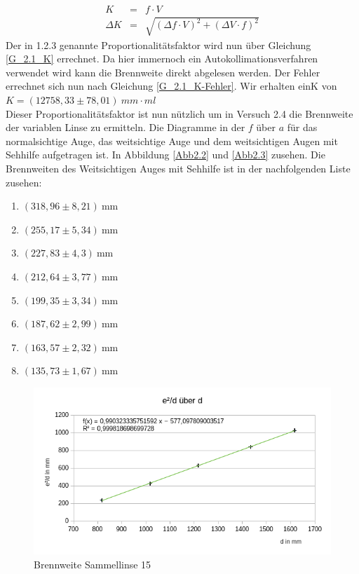 \documentclass[a4paper, 12pt]{article}
\begin{document}
	\begin{eqnarray}
		K&=&f\cdot V\label{G_2.1_K}\\
		\Delta K&=&\sqrt{(\Delta f\cdot V)^2+(\Delta V\cdot f)^2}\label{G_2.1_K-Fehler}
	\end{eqnarray}
Der in 1.2.3 genannte Proportionalitätsfaktor wird nun über Gleichung \ref{G_2.1_K} errechnet. Da hier immernoch ein Autokollimationsverfahren verwendet wird kann die Brennweite direkt abgelesen werden. Der Fehler errechnet sich nun nach Gleichung \ref{G_2.1_K-Fehler}. Wir erhalten ein$ $K von $K=(12758,33\pm 78,01)\ mm\cdot ml$ \\ Dieser Proportionalitätsfaktor ist nun nützlich um in Versuch 2.4 die Brennweite der variablen Linse zu ermitteln. Die Diagramme in der $f$ über $a$ für das normalsichtige Auge, das weitsichtige Auge und dem weitsichtigen Augen mit Sehhilfe aufgetragen ist. In Abbildung \ref{Abb2.2} und \ref{Abb2.3} zusehen.
Die Brennweiten des Weitsichtigen Auges mit Sehhilfe ist in der nachfolgenden Liste zusehen:
\begin{enumerate}
\item $(318,96\pm 8,21)\ $mm
\item $(255,17\pm 5,34)\ $mm
\item $(227,83\pm 4,3)\ $mm
\item $(212,64\pm 3,77)\ $mm
\item $(199,35\pm 3,34)\ $mm
\item $(187,62\pm 2,99)\ $mm
\item $(163,57\pm 2,32)\ $mm
\item $(135,73\pm 1,67)\ $mm
\end{enumerate}

\newpage
\begin{figure}
\centering
\includegraphics[scale=0.7]{12.png}
\caption{Brennweite Sammellinse 15}
\label{Abb1.2}
\end{figure}
\end{document}

